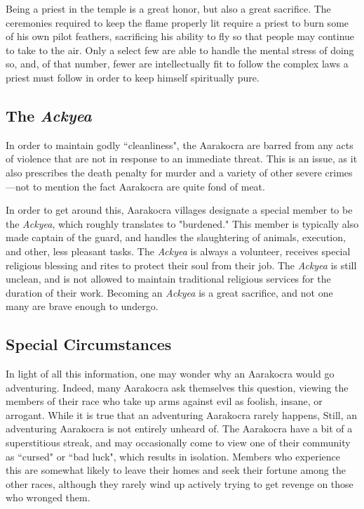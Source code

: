 Being a priest in the temple is a great honor, but also a great sacrifice.
The ceremonies required to keep the flame properly lit require a priest to burn some of his own pilot feathers, sacrificing his ability to fly so that people may continue to take to the air.
Only a select few are able to handle the mental stress of doing so, and, of that number, fewer are intellectually fit to follow the complex laws a priest must follow in order to keep himself spiritually pure.

\subsection{The \textit{Ackyea}}
In order to maintain godly ``cleanliness", the Aarakocra are barred from any acts of violence that are not in response to an immediate threat. 
This is an issue, as it also prescribes the death penalty for murder and a variety of other severe crimes---not to mention the fact Aarakocra are quite fond of meat.

In order to get around this, Aarakocra villages designate a special member to be the \textit{Ackyea}, which roughly translates to "burdened."
This member is typically also made captain of the guard, and handles the slaughtering of animals, execution, and other, less pleasant tasks.
The \textit{Ackyea} is always a volunteer, receives special religious blessing and rites to protect their soul from their job.
The \textit{Ackyea} is still unclean, and is not allowed to maintain traditional religious services for the duration of their work.
Becoming an \textit{Ackyea} is a great sacrifice, and not one many are brave enough to undergo.

\subsection{Special Circumstances}
In light of all this information, one may wonder why an Aarakocra would go adventuring.
Indeed, many Aarakocra ask themselves this question, viewing the members of their race who take up arms against evil as foolish, insane, or arrogant.
While it is true that an adventuring Aarakocra rarely happens, 
Still, an adventuring Aarakocra is not entirely unheard of.
The Aarakocra have a bit of a superstitious streak, and may occasionally come to view one of their community as ``cursed" or ``bad luck", which results in isolation.
Members who experience this are somewhat likely to leave their homes and seek their fortune among the other races, although they rarely wind up actively trying to get revenge on those who wronged them.

